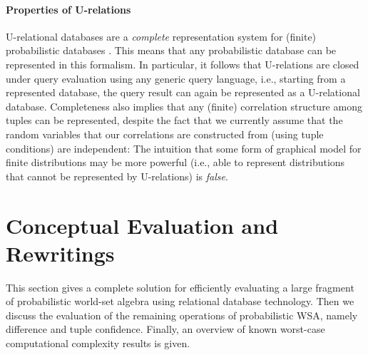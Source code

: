 \paragraph{Properties of U-relations}
U-relational databases are a {\em complete}\/ representation system for (finite) probabilistic databases \cite{AJKO2008}. This means that any probabilistic database can be represented in this formalism. In particular, it follows that U-relations are closed under query evaluation using any generic query language, i.e., starting from a represented database, the query result can again be represented as a U-relational database.
Completeness also implies that any (finite) correlation structure among tuples can be represented, despite the fact that we currently assume that the random variables that our correlations are constructed from (using tuple conditions) are independent: The intuition that some form of graphical model for finite distributions may be more powerful (i.e., able to represent distributions that cannot be represented by U-relations) is {\em false}\/.






\section{Conceptual Evaluation and Rewritings}
\label{sect:theory}


This section gives a complete solution for efficiently evaluating a large fragment of probabilistic world-set algebra using relational database technology. Then we discuss the evaluation of the remaining operations of probabilistic WSA, namely difference and tuple confidence. Finally, an overview of known worst-case computational complexity results is given.



